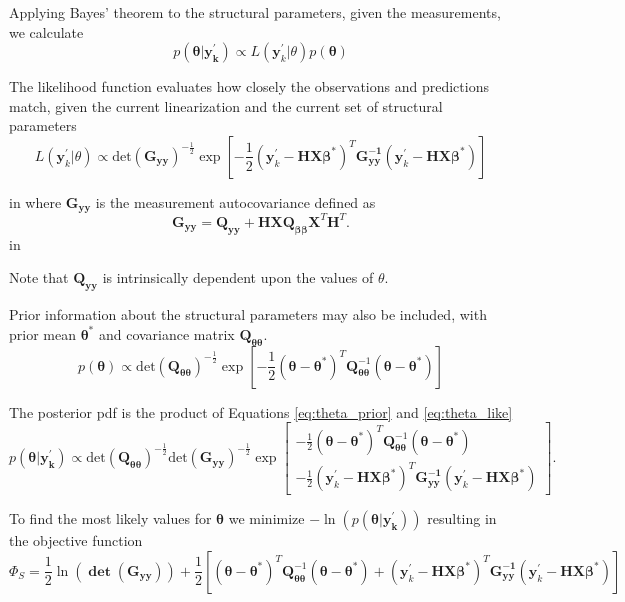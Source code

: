 \documentclass[11pt,oneside,onecolumn]{usgsreport}
\begin{document}
\begin{appendix}
\begin{bibunit}
Applying Bayes' theorem to the structural parameters, given the measurements,
we calculate
\[
p\left(\mathbf{\theta|\mathbf{y}_{k}^{'}}\right)\propto L\left(\mathbf{y}_{k}^{'}|\theta\right)p\left(\mathbf{\theta}\right)
\]


The likelihood function evaluates how closely the observations and
predictions match, given the current linearization and the current
set of structural parameters
\begin{equation}
L\left(\mathbf{y}_{k}^{'}|\theta\right)\propto\mathrm{det}\left(\mathbf{G_{yy}}\right)^{-\frac{1}{2}}\exp\left[-\frac{1}{2}\left(\mathbf{y}_{k}^{'}-\mathbf{HX\beta^{*}}\right)^{T}\mathbf{G_{yy}^{-1}}\left(\mathbf{y}_{k}^{'}-\mathbf{HX\beta^{*}}\right)\right]\label{eq:theta_like}
\end{equation}

 in
where $\mathbf{G_{yy}}$ is the measurement autocovariance defined
as 
\[
\mathbf{G_{yy}}=\mathbf{Q_{yy}}+\mathbf{HXQ_{\beta\beta}X}^{T}\mathbf{H}^{T}.
\]
 in

Note that $\mathbf{Q_{yy}}$ is intrinsically dependent upon the values
of $\theta.$

Prior information about the structural parameters may also be included,
with prior mean $\mathbf{\theta^{*}}$ and covariance matrix $\mathbf{Q_{\theta\theta}}$.
\begin{equation}
p\left(\mathbf{\theta}\right)\propto\mathrm{det}\left(\mathbf{Q_{\theta\theta}}\right)^{-\frac{1}{2}}\exp\left[-\frac{1}{2}\left(\mathbf{\theta-\theta^{*}}\right)^{T}\mathbf{Q}_{\mathbf{\theta\theta}}^{-1}\left(\mathbf{\theta-\theta^{*}}\right)\right]\label{eq:theta_prior}
\end{equation}


The posterior pdf is the product of Equations \ref{eq:theta_prior}
and \ref{eq:theta_like}
\[
p\left(\mathbf{\theta|\mathbf{y}_{k}^{'}}\right)\propto\mathrm{\mathrm{det}\left(\mathbf{Q_{\theta\theta}}\right)^{-\frac{1}{2}}det}\left(\mathbf{G_{yy}}\right)^{-\frac{1}{2}}\exp\left[\begin{array}{c}
-\frac{1}{2}\left(\mathbf{\theta-\theta^{*}}\right)^{T}\mathbf{Q}_{\mathbf{\theta\theta}}^{-1}\left(\mathbf{\theta-\theta^{*}}\right)\\
-\frac{1}{2}\left(\mathbf{y}_{k}^{'}-\mathbf{HX\beta^{*}}\right)^{T}\mathbf{G_{yy}^{-1}}\left(\mathbf{y}_{k}^{'}-\mathbf{HX\beta^{*}}\right)
\end{array}\right].
\]


To find the most likely values for $\mathbf{\theta}$ we minimize
$-\ln\left(p\left(\mathbf{\theta|\mathbf{y}_{k}^{'}}\right)\right)$
resulting in the objective function
\[
\Phi_{S}=\mathrm{\frac{1}{2}\ln\left(\mathbf{\det\left(G_{yy}\right)}\right)}+\frac{1}{2}\left[\left(\mathbf{\theta-\theta^{*}}\right)^{T}\mathbf{Q}_{\mathbf{\theta\theta}}^{-1}\left(\mathbf{\theta-\theta^{*}}\right)+\left(\mathbf{y}_{k}^{'}-\mathbf{HX\beta^{*}}\right)^{T}\mathbf{G_{yy}^{-1}}\left(\mathbf{y}_{k}^{'}-\mathbf{HX\beta^{*}}\right)\right]
\]



\end{bibunit}
\end{appendix}
\end{document}
